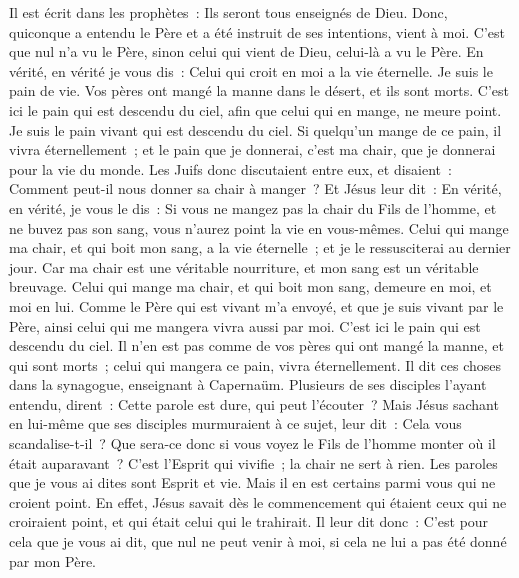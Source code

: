 \begin{multicols}{2}
Il est écrit dans les prophètes~: Ils seront tous enseignés de Dieu. Donc, quiconque a entendu le Père et a été instruit de ses intentions, vient à moi.
C'est que nul n'a vu le Père, sinon celui qui vient de Dieu, celui-là a vu le Père.
En vérité, en vérité je vous dis~: Celui qui croit en moi a la vie éternelle.
Je suis le pain de vie.
Vos pères ont mangé la manne dans le désert, et ils sont morts.
C'est ici le pain qui est descendu du ciel, afin que celui qui en mange, ne meure point.
Je suis le pain vivant qui est descendu du ciel. Si quelqu'un mange de ce pain, il vivra éternellement~; et le pain que je donnerai, c'est ma chair, que je donnerai pour la vie du monde.
Les Juifs donc discutaient entre eux, et disaient~: Comment peut-il nous donner sa chair à manger~?
Et Jésus leur dit~: En vérité, en vérité, je vous le dis~: Si vous ne mangez pas la chair du Fils de l'homme, et ne buvez pas son sang, vous n'aurez point la vie en vous-mêmes.
Celui qui mange ma chair, et qui boit mon sang, a la vie éternelle~; et je le ressusciterai au dernier jour.
Car ma chair est une véritable nourriture, et mon sang est un véritable breuvage.
Celui qui mange ma chair, et qui boit mon sang, demeure en moi, et moi en lui.
Comme le Père qui est vivant m'a envoyé, et que je suis vivant par le Père, ainsi celui qui me mangera vivra aussi par moi.
C'est ici le pain qui est descendu du ciel. Il n'en est pas comme de vos pères qui ont mangé la manne, et qui sont morts~; celui qui mangera ce pain, vivra éternellement.
Il dit ces choses dans la synagogue, enseignant à Capernaüm.
Plusieurs de ses disciples l'ayant entendu, dirent~: Cette parole est dure, qui peut l'écouter~?
Mais Jésus sachant en lui-même que ses disciples murmuraient à ce sujet, leur dit~: Cela vous scandalise-t-il~?
Que sera-ce donc si vous voyez le Fils de l'homme monter où il était auparavant~?
C'est l'Esprit qui vivifie~; la chair ne sert à rien. Les paroles que je vous ai dites sont Esprit et vie.
Mais il en est certains parmi vous qui ne croient point. En effet, Jésus savait dès le commencement qui étaient ceux qui ne croiraient point, et qui était celui qui le trahirait.
Il leur dit donc~: C'est pour cela que je vous ai dit, que nul ne peut venir à moi, si cela ne lui a pas été donné par mon Père.

\end{multicols}
